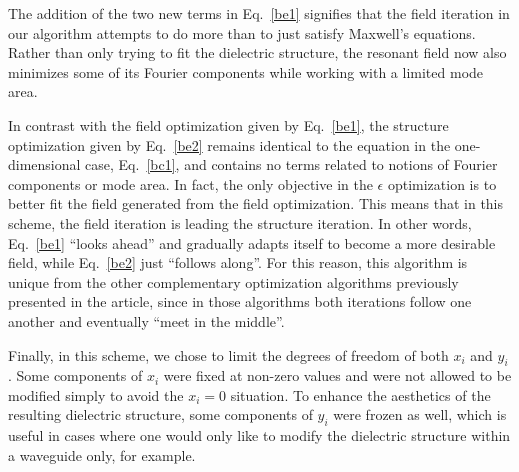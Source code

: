 \documentclass[10pt,letterpaper]{article}
\begin{document}
The addition of the two new terms in Eq.~\eqref{be1} signifies that the field iteration in our algorithm attempts to do more than to just satisfy Maxwell's equations. Rather than only trying to fit the dielectric structure, the resonant field now also minimizes some of its Fourier components while working with a limited mode area. 

In contrast with the field optimization given by Eq.~\eqref{be1}, the structure optimization given by Eq.~\eqref{be2} remains identical to the equation in the one-dimensional case, Eq.~\eqref{bc1}, and contains no terms related to notions of Fourier components or mode area. In fact, the only objective in the $\epsilon$ optimization is to better fit the field generated from the field optimization. This means that in this scheme, the field iteration is leading the structure iteration. In other words, Eq.~\eqref{be1} ``looks ahead'' and gradually adapts itself to become a more desirable field, while Eq.~\eqref{be2} just ``follows along''. For this reason, this algorithm is unique from the other complementary optimization algorithms previously presented in the article, since in those algorithms both iterations follow one another and eventually ``meet in the middle''.

Finally, in this scheme, we chose to limit the degrees of freedom of both $x_i$ and $y_i$. Some components of $x_i$ were fixed at non-zero values and were not allowed to be modified simply to avoid the $x_i = 0$ situation. To enhance the aesthetics of the resulting dielectric structure, some components of $y_i$ were frozen as well, which is useful in cases where one would only like to modify the dielectric structure within a waveguide only, for example. 
\end{document}
